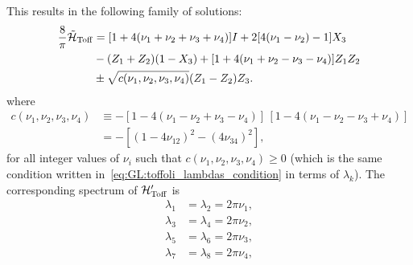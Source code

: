 This results in the following family of solutions:
\begin{equation}
\begin{aligned}
	\frac{8}{\pi}\tilde{{\mathcal{H}}}_{\operatorname{Toff}} &=
	[1 + 4(\nu_1+\nu_2+\nu_3+\nu_4)] I +
	2[4(\nu_1-\nu_2) - 1] X_3 \\
	&- (Z_1 + Z_2)(1 - X_3) +
	[1 + 4(\nu_1+\nu_2-\nu_3-\nu_4)] Z_1 Z_2 \\
	&\pm \sqrt{c(\nu_1,\nu_2,\nu_3,\nu_4)} (Z_1 - Z_2)Z_3.
\end{aligned}
\label{eq:GL:toff_tilde_general_solution}
\end{equation}
where
\begin{equation}
\begin{split}
	c(\nu_1, \nu_2, \nu_3, \nu_4) &\equiv
		-[1 - 4(\nu_1 - \nu_2 + \nu_3 - \nu_4)]
		\, [1 - 4(\nu_1 - \nu_2 - \nu_3 + \nu_4)]\\
		&= -[(1-4\nu_{12})^2-(4\nu_{34})^2],
\end{split}
\end{equation}
for all integer values of $\nu_i$ such that $c(\nu_1, \nu_2, \nu_3, \nu_4) \ge 0$ (which is the same condition written in~\cref{eq:GL:toffoli_lambdas_condition} in terms of $\lambda_k$).
The corresponding spectrum of ${\mathcal{H}}'_{\operatorname{Toff}}$ is
\begin{equation}
\begin{aligned}
	\lambda_1 &= \lambda_2 = 2\pi \nu_1, \\
	\lambda_3 &= \lambda_4 = 2\pi \nu_2, \\
	\lambda_5 &= \lambda_6 = 2\pi \nu_3, \\
	\lambda_7 &= \lambda_8 = 2\pi \nu_4, 
\end{aligned}
\end{equation}
